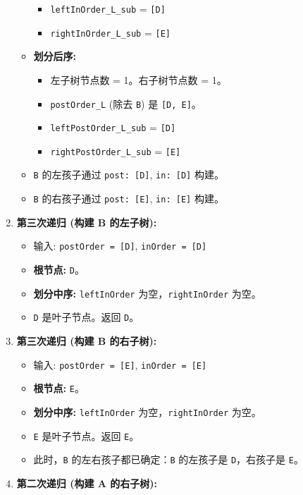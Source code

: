 \begin{enumerate}
\begin{itemize}
\begin{itemize}
			\item \lstinline{leftInOrder_L_sub} = \lstinline{[D]}
			\item \lstinline{rightInOrder_L_sub} = \lstinline{[E]}
		\end{itemize}
		\item \textbf{划分后序:}
		\begin{itemize}
			\item 左子树节点数 = 1。右子树节点数 = 1。
			\item \lstinline{postOrder_L} (除去 \lstinline{B}) 是 \lstinline{[D, E]}。
			\item \lstinline{leftPostOrder_L_sub} = \lstinline{[D]}
			\item \lstinline{rightPostOrder_L_sub} = \lstinline{[E]}
		\end{itemize}
		\item \lstinline{B} 的左孩子通过 \lstinline{post: [D]}, \lstinline{in: [D]} 构建。
		\item \lstinline{B} 的右孩子通过 \lstinline{post: [E]}, \lstinline{in: [E]} 构建。
	\end{itemize}
	\item \textbf{第三次递归 (构建 B 的左子树):}
	\begin{itemize}
		\item 输入: \lstinline{postOrder = [D]}, \lstinline{inOrder = [D]}
		\item \textbf{根节点:} \lstinline{D}。
		\item \textbf{划分中序:} \lstinline{leftInOrder} 为空，\lstinline{rightInOrder} 为空。
		\item \lstinline{D} 是叶子节点。返回 \lstinline{D}。
	\end{itemize}
	\item \textbf{第三次递归 (构建 B 的右子树):}
	\begin{itemize}
		\item 输入: \lstinline{postOrder = [E]}, \lstinline{inOrder = [E]}
		\item \textbf{根节点:} \lstinline{E}。
		\item \textbf{划分中序:} \lstinline{leftInOrder} 为空，\lstinline{rightInOrder} 为空。
		\item \lstinline{E} 是叶子节点。返回 \lstinline{E}。
		\item 此时，\lstinline{B} 的左右孩子都已确定：\lstinline{B} 的左孩子是 \lstinline{D}，右孩子是 \lstinline{E}。
	\end{itemize}
	\item \textbf{第二次递归 (构建 A 的右子树):}

\end{enumerate}

